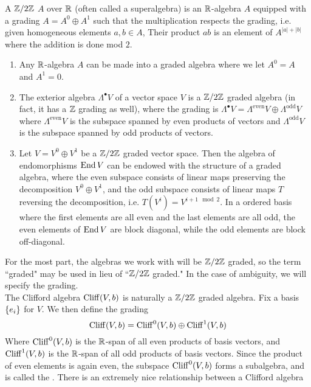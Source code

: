 %
\begin{defn}
A $\mathbb{Z}/2\mathbb{Z}$  $A$ over $\mathbb{R}$ (often called a superalgebra) is
an $\mathbb{R}$-algebra $A$ equipped with a grading $A = A^0 \oplus A^1$ such that
the multiplication respects the grading, i.e. given homogeneous elements
$a,b \in A$, Their product $ab$ is an element of $A^{|a| + |b|}$ where the
addition is done mod $2$.
\end{defn}
%
\begin{exmp}\enumbreak
\begin{enumerate}
  \item Any $\mathbb{R}$-algebra $A$ can be made into a graded algebra where we let
  $A^0 = A$ and $A^1 = 0$.
  \item The exterior algebra $\Lambda^\bullet V$ of a vector space $V$ is
  a $\mathbb{Z}/2\mathbb{Z}$ graded algebra (in fact, it has a $\mathbb{Z}$ grading as well), where the
  grading is
  $\Lambda^\bullet V = \Lambda^{\text{even}} V \oplus \Lambda^{\text{odd}} V$
  where $\Lambda^{\text{even}} V$ is the subspace spanned by even products of
  vectors and $\Lambda^{\text{odd}} V$ is the subspace spanned by odd products of vectors.
  \item Let $V = V^0 \oplus V^1$ be a $\mathbb{Z}/2\mathbb{Z}$ graded vector space. Then the
  algebra of endomorphisms $\operatorname{End} V$ can be endowed with the structure of a
  graded algebra, where the even subspace consists of linear maps preserving
  the decomposition $V^0 \oplus V^1$, and the odd subspace consists of
  linear maps $T$ reversing the decomposition, i.e. $T(V^i) = V^{i + 1 \mod 2}$.
  In a ordered basis where the first elements are all even and the last
  elements are all odd, the even elements of $\operatorname{End} V$ are block diagonal,
  while the odd elements are block off-diagonal.
\end{enumerate}
\end{exmp}
%
For the most part, the algebras we work with will be $\mathbb{Z}/2\mathbb{Z}$ graded, so
the term ``graded" may be used in lieu of ``$\mathbb{Z}/2\mathbb{Z}$ graded." In the case of
ambiguity, we will specify the grading. \\
The Clifford algebra $\operatorname{Cliff}(V,b)$ is naturally a $\mathbb{Z}/2\mathbb{Z}$ graded algebra. Fix
a basis $\left\lbrace e_i \right\rbrace$ for $V$. We then define the grading
\[
\operatorname{Cliff}(V,b) = \operatorname{Cliff}^0(V,b) \oplus \operatorname{Cliff}^1(V,b)
\]
Where $\operatorname{Cliff}^0(V,b)$ is the $\mathbb{R}$-span of all even products of basis vectors,
and $\operatorname{Cliff}^1(V,b)$ is the $\mathbb{R}$-span of all odd products of basis vectors.
Since the product of even elements is again even, the subspace
$\operatorname{Cliff}^0(V,b)$ forms a subalgebra, and is called the . There is an extremely nice relationship between a Clifford algebra
